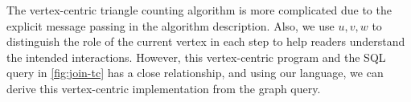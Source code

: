\documentclass{sokendai_thesis} %
\begin{document}
The vertex-centric triangle counting algorithm is more complicated due to the explicit message passing in the algorithm description.
Also, we use $u,v,w$ to distinguish the role of the current vertex in each step to help readers understand the intended interactions.
However, this vertex-centric program and the SQL query in \autoref{fig:join-tc} has a close relationship, and using our language, we can derive this vertex-centric implementation from the graph query.

\end{document}
